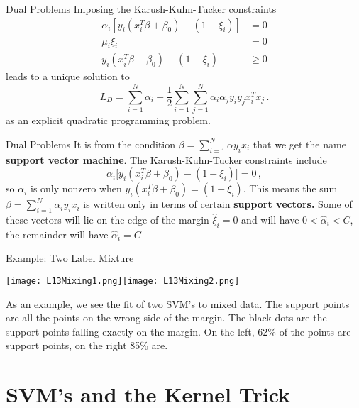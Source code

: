 \documentclass[10pt, table, dvipsnames,xcdraw]{beamer}
\begin{document}
\begin{frame}[fragile]{Dual Problems}
Imposing the Karush-Kuhn-Tucker constraints 
\begin{align*}
\alpha_i[y_i(x_i^T\beta+\beta_0)-(1-\xi_i)] &= 0
\\
\mu_i\xi_i &= 0
\\
y_i(x_i^T\beta+\beta_0)-(1-\xi_i) &\geq 0
\end{align*}
leads to a unique solution to
$$
L_D = \sum_{i=1}^N\alpha_i - \frac12 \sum_{i=1}^N\sum_{j=1}^N \alpha_i\alpha_jy_iy_jx_i^Tx_j\,.
$$\pause 
as an explicit quadratic programming problem. 
\end{frame}



\begin{frame}[fragile]{Dual Problems}
It is from the condition $\beta = \sum_{i=1}^N \alpha y_ix_i$ that we get the name \textbf{support vector machine}. \pause The Karush-Kuhn-Tucker constraints include
$$
\alpha_i\big[y_i(x_i^T\beta + \beta_0) -(1-\xi_i)\big] = 0\,,
$$
so $\alpha_i$ is only nonzero when $y_i(x_i^T\beta + \beta_0) =(1-\xi_i)$. This means the sum $\beta = \sum_{i=1}^N \alpha_i y_ix_i$ is written only in terms of certain \textbf{support vectors.} Some of these vectors will lie on the edge of the margin $\hat{\xi}_i=0$ and will have $0<\hat\alpha_i<C$, the remainder will have $\hat \alpha_i = C$
\end{frame}


\begin{frame}[fragile]{Example: Two Label Mixture}
  \begin{minipage}[t][0.5\textheight][t]{\textwidth}
	\centering \texttt{[image: L13Mixing1.png]}\texttt{[image: L13Mixing2.png]}
  \end{minipage}
  \vfill
\begin{minipage}[t][0.5\textheight][t]{\textwidth}
As an example, we see the fit of two SVM's to mixed data. The support points are all the points on the wrong side of the margin. The black dots are the support points falling exactly on the margin. \pause On the left, 62\% of the points are support points, on the right 85\% are. 
\end{minipage}
\end{frame}






\section{SVM's and the Kernel Trick}
\end{document}
